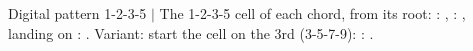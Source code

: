 \begin{patternbox}{Digital pattern 1-2-3-5}{  $|$ }
The 1-2-3-5 cell of each chord, from its root: : ,
: , landing on : .
Variant: start the cell on the 3rd (3-5-7-9): : .
\patternwhereline
\end{patternbox}
